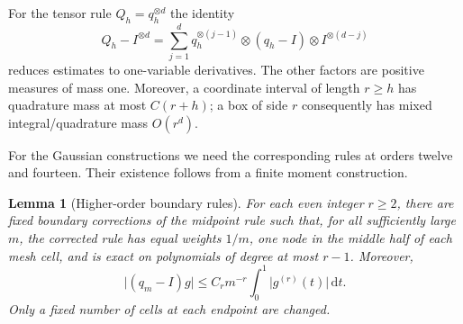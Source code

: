 \documentclass[11pt,a4paper]{article}
\newtheorem{lemma}[theorem]{Lemma}
\theoremstyle{definition}
\newcommand{\dd}{\,\mathrm d}
\newcommand{\abs}[1]{\lvert#1\rvert}
\numberwithin{equation}{section}
\begin{document}
For the tensor rule $Q_h=q_h^{\otimes d}$ the identity
\begin{equation}\label{eq:telescoping}
 Q_h-I^{\otimes d}=\sum_{j=1}^d q_h^{\otimes(j-1)}
                       \otimes(q_h-I)\otimes I^{\otimes(d-j)}
\end{equation}
reduces estimates to one-variable derivatives. The other factors are positive measures of mass one. Moreover, a coordinate interval of length $r\ge h$ has quadrature mass at most $C(r+h)$; a box of side $r$ consequently has mixed integral/quadrature mass $O(r^d)$.

For the Gaussian constructions we need the corresponding rules at orders twelve and fourteen. Their existence follows from a finite moment construction.

\begin{lemma}[Higher-order boundary rules]\label{lem:highrule}
For each even integer $r\ge2$, there are fixed boundary corrections of the midpoint rule such that, for all sufficiently large $m$, the corrected rule has equal weights $1/m$, one node in the middle half of each mesh cell, and is exact on polynomials of degree at most $r-1$. Moreover,
\begin{equation}\label{eq:highrule}
 \abs{(q_m-I)g}\le C_r m^{-r}\int_0^1\abs{g^{(r)}(t)}\dd t.
\end{equation}
Only a fixed number of cells at each endpoint are changed.
\end{lemma}
\end{document}
